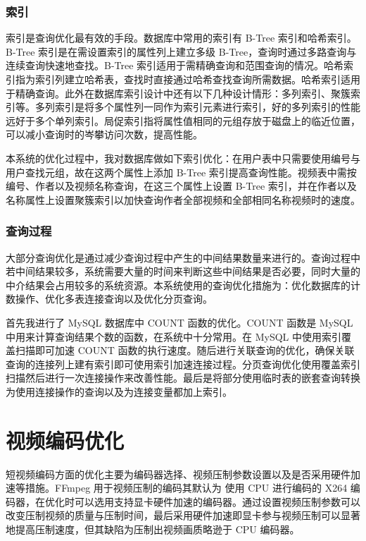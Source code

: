 \subsubsection{索引}

索引是查询优化最有效的手段。数据库中常用的索引有 B-Tree\cite{严蔚敏2002数据结构} 索引和哈希索引。B-Tree 索引是在需设置索引的属性列上建立多级 B-Tree，查询时通过多路查询与连续查询快速地查找。B-Tree 索引适用于需精确查询和范围查询的情况。哈希索引指为索引列建立哈希表，查找时直接通过哈希查找查询所需数据。哈希索引适用于精确查询。此外在数据库索引设计中还有以下几种设计情形：多列索引、聚簇索引等。多列索引是将多个属性列一同作为索引元素进行索引，好的多列索引的性能远好于多个单列索引。局促索引指将属性值相同的元组存放于磁盘上的临近位置，可以减小查询时的岑攀访问次数，提高性能。

本系统的优化过程中，我对数据库做如下索引优化：在用户表中只需要使用编号与用户查找元组，故在这两个属性上添加 B-Tree 索引提高查询性能。视频表中需按编号、作者以及视频名称查询，在这三个属性上设置 B-Tree 索引，并在作者以及名称属性上设置聚簇索引以加快查询作者全部视频和全部相同名称视频时的速度。 

\subsubsection{查询过程}

大部分查询优化是通过减少查询过程中产生的中间结果数量来进行的。查询过程中若中间结果较多，系统需要大量的时间来判断这些中间结果是否必要，同时大量的中介结果会占用较多的系统资源。本系统使用的查询优化措施为：优化数据库的计数操作、优化多表连接查询以及优化分页查询。

首先我进行了 MySQL 数据库中 COUNT 函数的优化。COUNT 函数是 MySQL 中用来计算查询结果个数的函数，在系统中十分常用。在 MySQL 中使用索引覆盖扫描即可加速 COUNT 函数的执行速度。随后进行关联查询的优化，确保关联查询的连接列上建有索引即可使用索引加速连接过程。分页查询优化使用覆盖索引扫描然后进行一次连接操作来改善性能。最后是将部分使用临时表的嵌套查询转换为使用连接操作的查询以及为连接变量都加上索引。

\section{视频编码优化}
短视频编码方面的优化主要为编码器选择、视频压制参数设置以及是否采用硬件加速等措施。FFmpeg 用于视频压制的编码其默认为 使用 CPU 进行编码的 X264 编码器，在优化时可以选用支持显卡硬件加速的编码器。通过设置视频压制参数可以改变压制视频的质量与压制时间，最后采用硬件加速即显卡参与视频压制可以显著地提高压制速度，但其缺陷为压制出视频画质略逊于 CPU 编码器。

